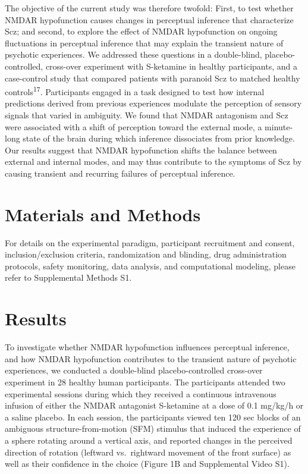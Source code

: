 \documentclass[
]{article}
\begin{document}
The objective of the current study was therefore twofold: First, to test
whether NMDAR hypofunction causes changes in perceptual inference that
characterize Scz; and second, to explore the effect of NMDAR
hypofunction on ongoing fluctuations in perceptual inference that may
explain the transient nature of psychotic experiences. We addressed
these questions in a double-blind, placebo-controlled, cross-over
experiment with S-ketamine in healthy participants, and a case-control
study that compared patients with paranoid Scz to matched healthy
controls\textsuperscript{17}. Participants engaged in a task designed to
test how internal predictions derived from previous experiences modulate
the perception of sensory signals that varied in ambiguity. We found
that NMDAR antagonism and Scz were associated with a shift of perception
toward the external mode, a minute-long state of the brain during which
inference dissociates from prior knowledge. Our results suggest that
NMDAR hypofunction shifts the balance between external and internal
modes, and may thus contribute to the symptoms of Scz by causing
transient and recurring failures of perceptual inference.

\section{Materials and Methods}\label{materials-and-methods}

For details on the experimental paradigm, participant recruitment and
consent, inclusion/exclusion criteria, randomization and blinding, drug
administration protocols, safety monitoring, data analysis, and
computational modeling, please refer to Supplemental Methods S1.

\section{Results}\label{results}

To investigate whether NMDAR hypofunction influences perceptual
inference, and how NMDAR hypofunction contributes to the transient
nature of psychotic experiences, we conducted a double-blind
placebo-controlled cross-over experiment in 28 healthy human
participants. The participants attended two experimental sessions during
which they received a continuous intravenous infusion of either the
NMDAR antagonist S-ketamine at a dose of 0.1 mg/kg/h or a saline
placebo. In each session, the participants viewed ten 120 sec blocks of
an ambiguous structure-from-motion (SFM) stimulus that induced the
experience of a sphere rotating around a vertical axis, and reported
changes in the perceived direction of rotation (leftward vs.~rightward
movement of the front surface) as well as their confidence in the choice
(Figure 1B and Supplemental Video S1).
\end{document}
